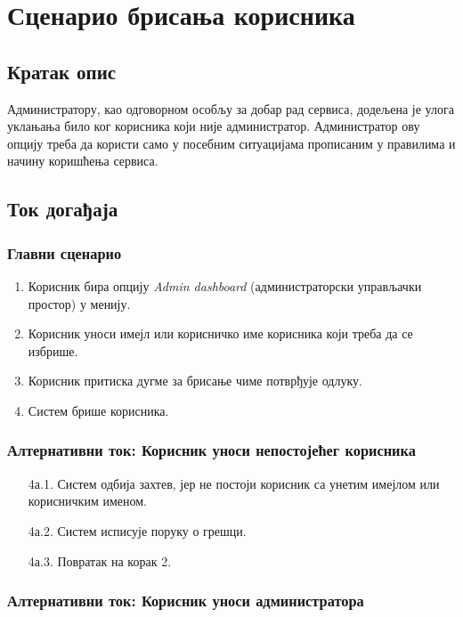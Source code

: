 \section{Сценарио брисања корисника}

\subsection{Кратак опис}

Администратору, као одговорном особљу за добар рад сервиса, додељена је улога уклањања било ког
корисника који није администратор. Администратор ову опцију треба да користи само у посебним
ситуацијама прописаним у правилима и начину коришћења сервиса.

\subsection{Ток догађаја}

\subsubsection{Главни сценарио}

\begin{enumerate}
    \item Корисник бира опцију \textit{Admin dashboard} (администраторски управљачки простор) у менију.
    \item Корисник уноси имејл или корисничко име корисника који треба да се избрише.
    \item Корисник притиска дугме за брисање чиме потврђује одлуку.
    \item Систем брише корисника.
\end{enumerate}

\subsubsection{Алтернативни ток: Корисник уноси непостојећег корисника}

\begin{enumerate}
    \item [4а.1.] Систем одбија захтев, јер не постоји корисник са унетим имејлом или корисничким
      именом.
    \item [4а.2.] Систем исписује поруку о грешци.
    \item [4а.3.] Повратак на корак 2.
\end{enumerate}

\subsubsection{Алтернативни ток: Корисник уноси администратора}

